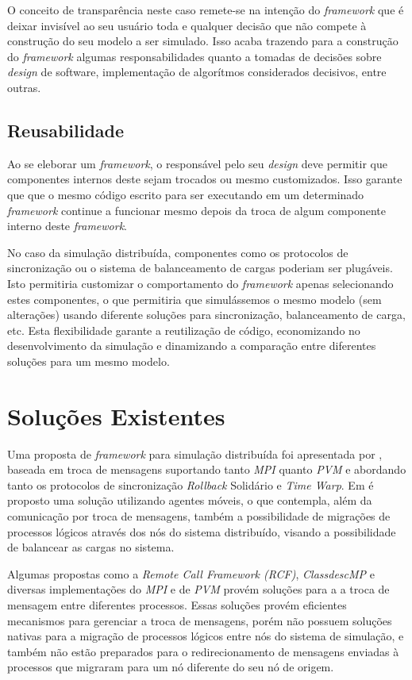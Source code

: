 O conceito de transparência neste caso remete-se na intenção do \textit{framework} que é deixar invisível ao seu usuário toda e qualquer decisão que não compete à construção do seu modelo a ser simulado. Isso acaba trazendo para a construção do \textit{framework} algumas responsabilidades quanto a tomadas de decisões sobre \textit{design} de software, implementação de algorítmos considerados decisivos, entre outras.

\subsection{Reusabilidade}

Ao se eleborar um \textit{framework}, o responsável pelo seu \textit{design} deve permitir que componentes internos deste sejam trocados ou mesmo customizados. Isso garante que que o mesmo código escrito para ser executando em um determinado \textit{framework} continue a funcionar mesmo depois da troca de algum componente interno deste \textit{framework}.

No caso da simulação distribuída, componentes como os protocolos de sincronização ou o sistema de balanceamento de cargas poderiam ser plugáveis. Isto permitiria customizar o comportamento do \textit{framework} apenas selecionando estes componentes, o que permitiria que simulássemos o mesmo modelo (sem alterações) usando diferente soluções para sincronização, balanceamento de carga, etc. Esta flexibilidade garante a reutilização de código, economizando no desenvolvimento da simulação e dinamizando a comparação entre diferentes soluções para um mesmo modelo.

\section{Soluções Existentes \label{solucoes_existentes}}

Uma proposta de \textit{framework} para simulação distribuída foi apresentada por \cite{LIVERSON}, baseada em troca de mensagens suportando tanto \textit{MPI} quanto \textit{PVM} e abordando tanto os protocolos de sincronização \textit{Rollback} Solidário e \textit{Time Warp}. Em \cite{RIBEIROALVES} é proposto uma solução utilizando agentes móveis, o que contempla, além da comunicação por troca de mensagens, também a possibilidade de migrações de processos lógicos através dos nós do sistema distribuído, visando a possibilidade de balancear as cargas no sistema.

Algumas propostas como a \textit{Remote Call Framework (RCF)}, \textit{ClassdescMP} e diversas implementações do \textit{MPI} e de \textit{PVM} provém soluções para a a troca de mensagem entre diferentes processos. Essas soluções provém eficientes mecanismos para gerenciar a troca de mensagens, porém não possuem soluções nativas para a migração de processos lógicos entre nós do sistema de simulação, e também não estão preparados para o redirecionamento de mensagens enviadas à processos que migraram para um nó diferente do seu nó de origem.

